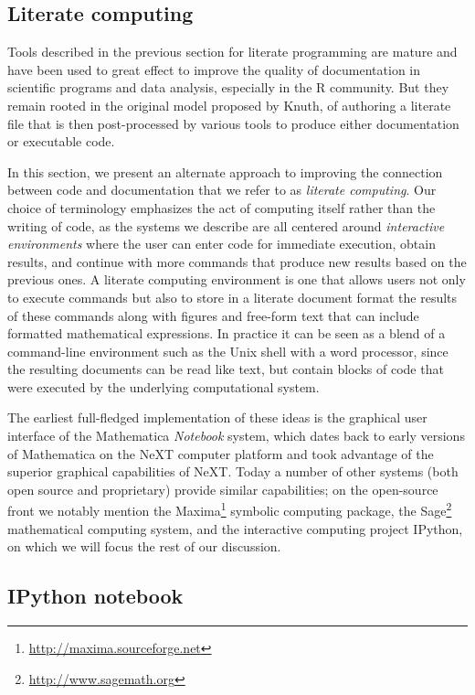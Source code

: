\documentclass[ChapterTOCs,krantz2]{krantz} %
\begin{document}
\subsection{Literate computing}

Tools described in the previous section for literate programming are mature and
have been used to great effect to improve the quality of documentation in
scientific programs and data analysis, especially in the R community.  But they
remain rooted in the original model proposed by Knuth, of authoring a
literate file that is then post-processed by various tools to produce either
documentation or executable code.  

In this section, we present an alternate approach to improving the connection
between code and documentation that we refer to as \emph{literate computing}.
Our choice of terminology emphasizes the act of computing itself rather than
the writing of code, as the systems we describe are all centered around
\emph{interactive environments} where the user can enter code for immediate
execution, obtain results, and continue with more commands that produce new
results based on the previous ones.  A literate computing environment is one
that allows users not only to execute commands but also to store in a literate
document format the results of these commands along with figures and free-form
text that can include formatted mathematical expressions.  In practice it can
be seen as a blend of a command-line environment such as the Unix shell with a
word processor, since the resulting documents can be read like text, but
contain blocks of code that were executed by the underlying computational
system.

The earliest full-fledged implementation of these ideas is the graphical user
interface of the Mathematica \emph{Notebook} system, which dates back to early
versions of Mathematica on the NeXT computer platform and took advantage of the
superior graphical capabilities of NeXT.  Today a number of other systems (both
open source and proprietary) provide similar capabilities; on the open-source
front we notably mention the
Maxima\footnote{\url{http://maxima.sourceforge.net}} symbolic computing
package, the Sage\footnote{\url{http://www.sagemath.org}} mathematical
computing system, and the interactive computing project IPython, on which we
will focus the rest of our discussion.

\subsection{IPython notebook}\label{subsec:IPython}
\end{document}
